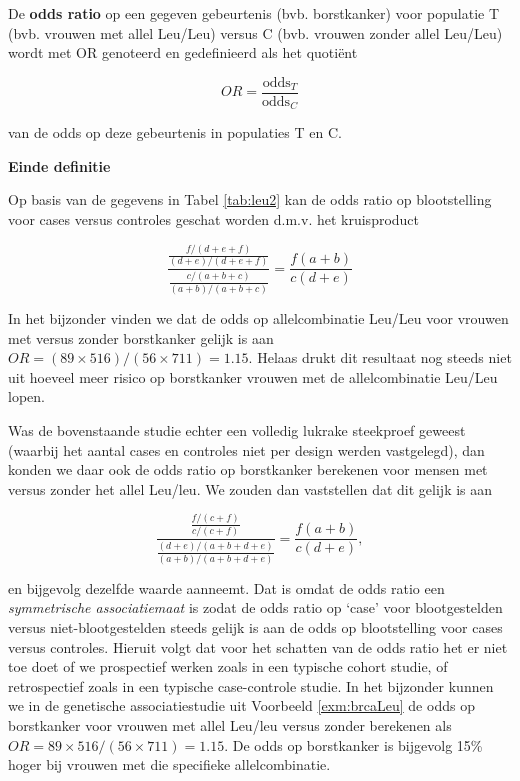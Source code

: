 \documentclass[12pt,dutch,coursenotes]{book}
\theoremstyle{definition}
\theoremstyle{definition}
\theoremstyle{definition}
\theoremstyle{remark}
\let\BeginKnitrBlock\begin \let\EndKnitrBlock\end
\begin{document}
\BeginKnitrBlock{definition}[Odds ratio]
\protect\hypertarget{def:unnamed-chunk-59}{}{\label{def:unnamed-chunk-59}
\iffalse (Odds ratio) \fi{} }De \textbf{odds ratio} op een gegeven
gebeurtenis (bvb. borstkanker) voor populatie T (bvb. vrouwen met allel
Leu/Leu) versus C (bvb. vrouwen zonder allel Leu/Leu) wordt met OR
genoteerd en gedefinieerd als het quotiënt

\begin{equation*}
OR=\frac{\mbox{odds}_T}{\mbox{odds}_C}
\end{equation*}

van de odds op deze gebeurtenis in populaties T en C.

\textbf{Einde definitie}
\EndKnitrBlock{definition}

Op basis van de gegevens in Tabel \ref{tab:leu2} kan de odds ratio op
blootstelling voor cases versus controles geschat worden d.m.v. het
kruisproduct

\begin{equation*}
\frac{ \frac{ f/(d+e+f)}{(d+e)/(d+e+f)} }{ \frac{c/(a+b+c)}{(a+b)/(a+b+c)}} = \frac{f(a+b)}{c (d+e)}
\end{equation*}

In het bijzonder vinden we dat de odds op allelcombinatie Leu/Leu voor
vrouwen met versus zonder borstkanker gelijk is aan
\(OR=(89\times 516)/(56\times 711)=1.15\). Helaas drukt dit resultaat
nog steeds niet uit hoeveel meer risico op borstkanker vrouwen met de
allelcombinatie Leu/Leu lopen.

Was de bovenstaande studie echter een volledig lukrake steekproef
geweest (waarbij het aantal cases en controles niet per design werden
vastgelegd), dan konden we daar ook de odds ratio op borstkanker
berekenen voor mensen met versus zonder het allel Leu/leu. We zouden dan
vaststellen dat dit gelijk is aan

\begin{equation*}
\frac{ \frac{ f/(c+f)}{c/(c+f)} }{ \frac{(d+e)/(a+b+d+e)}{(a+b)/(a+b+d+e)}} = \frac{f(a+b)}{c(d+e)},
\end{equation*}

en bijgevolg dezelfde waarde aanneemt. Dat is omdat de odds ratio een
\emph{symmetrische associatiemaat} is zodat de odds ratio op `case' voor
blootgestelden versus niet-blootgestelden steeds gelijk is aan de odds
op blootstelling voor cases versus controles. Hieruit volgt dat voor het
schatten van de odds ratio het er niet toe doet of we prospectief werken
zoals in een typische cohort studie, of retrospectief zoals in een
typische case-controle studie. In het bijzonder kunnen we in de
genetische associatiestudie uit Voorbeeld \ref{exm:brcaLeu} de odds op
borstkanker voor vrouwen met allel Leu/leu versus zonder berekenen als
\(OR=89\times 516/(56\times 711)=1.15\). De odds op borstkanker is
bijgevolg 15\% hoger bij vrouwen met die specifieke allelcombinatie.
\end{document}
